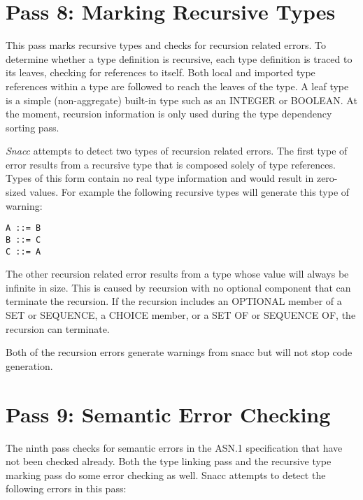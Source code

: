 \section{\label{comp-pass8-section}Pass 8: Marking Recursive Types}


This pass marks recursive types and checks for recursion related
errors.  To determine whether a type definition is recursive, each
type definition is traced to its leaves, checking for references to
itself.  Both local and imported type references within a type are
followed to reach the leaves of the type.  A leaf type is a simple
(non-aggregate) built-in type such as an INTEGER or BOOLEAN\@. At the
moment, recursion information is only used during the type dependency
sorting pass.

{\em Snacc} attempts to detect two types of recursion related errors.  The
first type of error results from a recursive type that is composed
solely of type references.  Types of this form contain no real type
information and would result in zero-sized values.  For example the
following recursive types will generate this type of warning:
\begin{small}
\begin{verbatim}
A ::= B
B ::= C
C ::= A
\end{verbatim}
\end{small}

The other recursion related error results from a type whose value will
always be infinite in size.  This is caused by recursion with no
optional component that can terminate the recursion.  If the recursion
includes an OPTIONAL member of a SET or SEQUENCE, a CHOICE member, or
a SET OF or SEQUENCE OF, the recursion can terminate.

Both of the recursion errors generate warnings from snacc but will
not stop code generation.


\section{\label{comp-pass9-section}Pass 9: Semantic Error Checking}
The ninth pass checks for semantic errors in the ASN.1 specification
that have not been checked already. Both the type linking pass and the
recursive type marking pass do some error checking as well. Snacc attempts
to detect the following errors in this pass:

